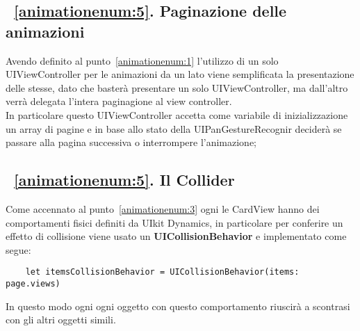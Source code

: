 \subsection{~\ref{animationenum:5}. Paginazione delle animazioni}

Avendo definito al punto~\ref{animationenum:1} l'utilizzo di un solo UIViewController per le animazioni da un lato viene semplificata
la presentazione delle stesse, dato che basterà presentare un solo UIViewController, ma dall'altro verrà delegata
l'intera paginagione al view controller. \\

In particolare questo UIViewController accetta come variabile di inizializzazione
un array di pagine e in base allo stato della UIPanGestureRecognir deciderà se passare alla pagina successiva
o interrompere l'animazione;

\subsection{~\ref{animationenum:5}. Il Collider}

Come accennato al punto~\ref{animationenum:3} ogni le CardView hanno dei comportamenti fisici definiti
da UIkit Dynamics, in particolare per conferire un effetto di collisione viene usato un \textbf{UICollisionBehavior} e implementato come segue:

\begin{verbatim}
    let itemsCollisionBehavior = UICollisionBehavior(items: page.views)
\end{verbatim}

In questo modo ogni ogni oggetto con questo
comportamento riuscirà a scontrasi con gli altri oggetti simili.
